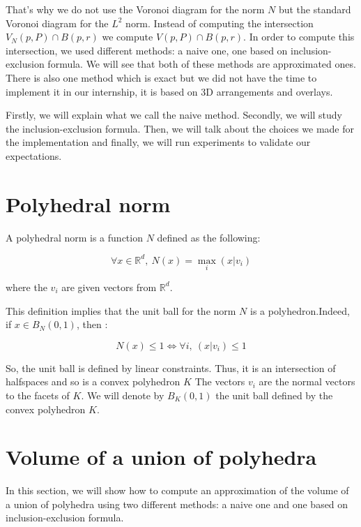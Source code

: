 That's why we do not use the Voronoi diagram for the norm $ N $ but the standard
Voronoi diagram for the $ L^2 $ norm. Instead of computing the intersection $
V_N(p, P) \cap B(p, r) $ we compute $ V(p, P) \cap B(p, r) $. In order to
compute this intersection, we used different methods: a naive one, one based on
inclusion-exclusion formula. We will see that both of these methods are
approximated ones. There is also one method which is exact but we did not have
the time to implement it in our internship, it is based on 3D arrangements and
overlays.

Firstly, we will explain what we call the naive method. Secondly, we will study the
inclusion-exclusion formula. Then, we will talk about the choices we made for
the implementation and finally, we will run experiments to validate our
expectations.

\section{Polyhedral norm}
\label{sec:polyhedral-norm}
A polyhedral norm is a function $ N $ defined as the following:

\begin{equation}
    \forall x \in \mathbb{R}^d,~ N(x) = \max_{i} (x | v_i)
\end{equation}

where the $ v_i $ are given vectors from $ \mathbb{R}^d $.

This definition implies that the unit ball for the norm $ N $ is a
polyhedron.Indeed, if $ x \in B_N(0, 1) $, then :

$$ N(x) \leq 1 \Longleftrightarrow \forall i,~(x | v_i) \leq 1 $$

So, the unit ball is defined by linear constraints. Thus, it is an intersection
of halfspaces and so is a convex polyhedron $ K $ The vectors $ v_i $ are the
normal vectors to the facets of $ K $. We will denote by $ B_K(0, 1) $ the unit
ball defined by the convex polyhedron $ K $.

\section{Volume of a union of polyhedra}

In this section, we will show how to compute an approximation of the volume of
a union of polyhedra using two different methods: a naive one and one based on
inclusion-exclusion formula.

